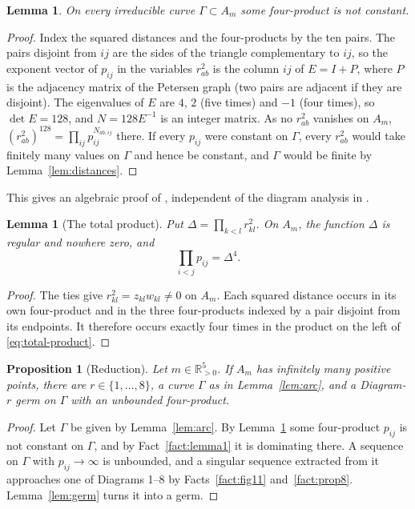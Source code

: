 \documentclass[11pt]{amsart}
\newtheorem{proposition}[theorem]{Proposition}
\newtheorem{lemma}[theorem]{Lemma}
\theoremstyle{definition}
\theoremstyle{remark}
\newcommand{\Rp}{\mathbb{R}_{>0}}
\begin{document}
\begin{lemma}\label{lem:petersen}
On every irreducible curve $\Gamma\subset A_m$ some four-product is not constant.
\end{lemma}
\begin{proof}
Index the squared distances and the four-products by the ten pairs.  The pairs disjoint from
$ij$ are the sides of the triangle complementary to $ij$, so the exponent vector of $p_{ij}$ in
the variables $r_{ab}^2$ is the column $ij$ of $E=I+P$, where $P$ is the adjacency matrix of the
Petersen graph (two pairs are adjacent if they are disjoint).  The eigenvalues of $E$ are $4$,
$2$ (five times) and $-1$ (four times), so $\det E=128$, and $N=128E^{-1}$ is an integer
matrix.  As no $r_{ab}^2$ vanishes on $A_m$, $(r_{ab}^2)^{128}=\prod_{ij}p_{ij}^{N_{ab,ij}}$ there.
If every $p_{ij}$ were constant on $\Gamma$, every $r_{ab}^2$ would take finitely many values on
$\Gamma$ and hence be constant, and $\Gamma$ would be finite by Lemma~\ref{lem:distances}.
\end{proof}
This gives an algebraic proof of \cite[Prop.~9]{AK}, independent of the diagram analysis in
\cite[Fig.~11]{AK}.

{
\begin{lemma}[The total product]\label{lem:total-product}
Put $\Delta=\prod_{k<l}r_{kl}^2$.  On $A_m$, the function $\Delta$ is regular and nowhere zero,
and
\begin{equation}\label{eq:total-product}
  \prod_{i<j}p_{ij}=\Delta^4.
\end{equation}
\end{lemma}
\begin{proof}
The ties give $r_{kl}^2=z_{kl}w_{kl}\ne0$ on $A_m$.  Each squared distance occurs in its own
four-product and in the three four-products indexed by a pair disjoint from its endpoints.
It therefore occurs exactly four times in the product on the left of \eqref{eq:total-product}.
\end{proof}
}

\begin{proposition}[Reduction]\label{prop:reduction}
Let $m\in\Rp^5$.  If $A_m$ has infinitely many positive points, there are $r\in\{1,\dots,8\}$, a
curve $\Gamma$ as in Lemma~\ref{lem:arc}, and a Diagram-$r$ germ on $\Gamma$ with an unbounded
four-product.
\end{proposition}

\begin{proof}
Let $\Gamma$ be given by Lemma~\ref{lem:arc}.  By Lemma~\ref{lem:petersen} some four-product
$p_{ij}$ is not constant on $\Gamma$, and by Fact~\ref{fact:lemma1} it is dominating there.  A
sequence on $\Gamma$ with $p_{ij}\to\infty$ is unbounded, and a singular sequence extracted from
it approaches one of Diagrams 1--8 by Facts~\ref{fact:fig11} and~\ref{fact:prop8}.
Lemma~\ref{lem:germ} turns it into a germ.
\end{proof}
\end{document}
